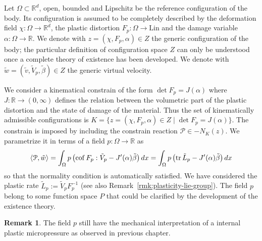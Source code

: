 \documentclass[a4paper,10pt,oneside]{amsbook}
\numberwithin{section}{chapter}
\numberwithin{equation}{chapter}
\theoremstyle{definition}
\newtheorem{rmk}[prop]{Remark}
\DeclareMathOperator{\cof}{cof}
\DeclareMathOperator{\tr}{tr}
\DeclarePairedDelimiter{\dual}{\langle}{\rangle}
\begin{document}
Let $\Omega\subset\mathbb{R}^d$, open, bounded and Lipschitz be the reference configuration of the body. Its configuration is assumed to be completely described by the deformation field $\chi\colon\Omega\to\mathbb{R}^d$, the plastic distortion $F_p\colon\Omega\to\text{Lin}$ and the damage variable $\alpha\colon\Omega\to\mathbb{R}$. We denote with $z=(\chi,F_p,\alpha)\in Z$ the generic configuration of the body; the particular definition of configuration space $Z$ can only be understood once a complete theory of existence has been developed. We denote with $\tilde w=(\tilde v,\tilde V_p,\tilde\beta)\in Z$ the generic virtual velocity.

We consider a kinematical constrain of the form $\det F_p=J(\alpha)$ where $J\colon\mathbb{R}\to(0,\infty)$ defines the relation between the volumetric part of the plastic distortion and the state of damage of the material. Thus the set of kinematically admissible configurations is $K=\{z=(\chi,F_p,\alpha)\in Z\;|\;\det F_p=J(\alpha)\}$. The constrain is imposed by including the constrain reaction $\mathcal{P}\in-N_K(z)$. We parametrize it in terms of a field $p\colon\Omega\to\mathbb{R}$ as
\[
\dual{\mathcal{P},\tilde w}=\int_\Omega p\left(\cof F_p:\tilde V_p-J'(\alpha)\tilde\beta\right)dx=\int_\Omega p\left(\tr\tilde L_p-J'(\alpha)\tilde\beta\right)dx
\]
so that the normality condition is automatically satisfied. We have considered the plastic rate $\tilde L_p:=\tilde V_pF_p^{-1}$ (see also Remark~\ref{rmk:plasticity-lie-group}). The field $p$ belong to some function space $P$ that could be clarified by the development of the existence theory.
\begin{rmk}
The field $p$ still have the mechanical interpretation of a internal plastic micropressure as observed in previous chapter.
\end{rmk}
\end{document}
